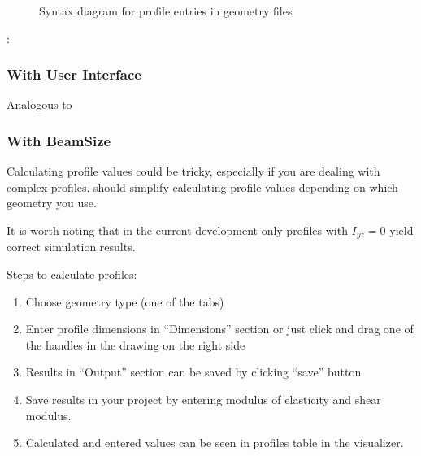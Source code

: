 \documentclass[letterpaper,10pt,english]{sphinxmanual}
\begin{document}
\begin{figure}[htbp]
\centering
\capstart

\noindent{}
\caption{Syntax diagram for profile entries in geometry files}\label{\detokenize{making_a_model:id22}}\end{figure}

:

\begin{sphinxVerbatim}[commandchars=\\\{\}]
\end{sphinxVerbatim}


\subsubsection{With User Interface}
\label{\detokenize{making_a_model:id16}}
Analogous to {\hyperref[\detokenize{making_a_model:nodes-input}]{}}


\subsubsection{With BeamSize}
\label{\detokenize{making_a_model:with-beamsize}}
Calculating profile values could be tricky, especially if you are dealing with complex profiles.
 should simplify calculating profile values depending on which geometry you use.

It is worth noting that in the current development only profiles with \(I_{yz}=0\) yield correct simulation results.

Steps to calculate profiles:
\begin{enumerate}
%
\item {} 
Choose geometry type (one of the tabs)

\item {} 
Enter profile dimensions in “Dimensions” section or just click and drag one of the handles in the drawing on the right side

\item {} 
Results in “Output” section can be saved by clicking “save” button

\item {} 
Save results in your project by entering modulus of elasticity and shear modulus.

\item {} 
Calculated and entered values can be seen in profiles table in the visualizer.

\end{enumerate}
\end{document}
